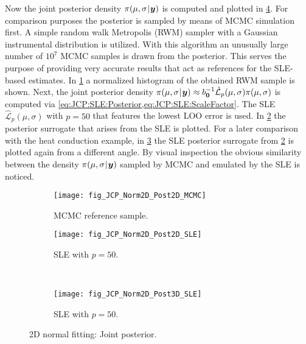 \par %
Now the joint posterior density \(\pi(\mu,\sigma {\:\!}|{\:\!} \bm{y})\) is computed and plotted in \cref{fig:JCP:Normal:Post2D}.
For comparison purposes the posterior is sampled by means of MCMC simulation first.
A simple random walk Metropolis (RWM) sampler with a Gaussian instrumental distribution is utilized.
With this algorithm an unusually large number of \(10^7\) MCMC samples is drawn from the posterior.
This serves the purpose of providing very accurate results that act as references for the SLE-based estimates.
In \cref{fig:JCP:Normal:Post2D:MCMC} a normalized histogram of the obtained RWM sample is shown.
Next, the joint posterior density \(\pi(\mu,\sigma {\:\!}|{\:\!} \bm{y}) \approx b_{\bm{0}}^{-1} \hat{\mathcal{L}}_p(\mu,\sigma) \pi(\mu,\sigma)\)
is computed via \cref{eq:JCP:SLE:Posterior,eq:JCP:SLE:ScaleFactor}.
The SLE \(\hat{\mathcal{L}}_p(\mu,\sigma)\) with \(p = 50\) that features the lowest LOO error is used.
In \cref{fig:JCP:Normal:Post2D:SLE} the posterior surrogate that arises from the SLE is plotted.
For a later comparison with the heat conduction example,
in \cref{fig:JCP:Normal:Post3D:SLE} the SLE posterior surrogate from \cref{fig:JCP:Normal:Post2D:SLE} is plotted again from a different angle.
By visual inspection the obvious similarity between the density \(\pi(\mu,\sigma {\:\!}|{\:\!} \bm{y})\) sampled by MCMC and emulated by the SLE is noticed.
\begin{figure}[htbp]
  \centering
  \begin{subfigure}[b]{\JCPsubWidth}
    \centering
    \texttt{[image: fig\_JCP\_Norm2D\_Post2D\_MCMC]}
    \caption{MCMC reference sample.}
    \label{fig:JCP:Normal:Post2D:MCMC}
  \end{subfigure}\hfill%
  \begin{subfigure}[b]{\JCPsubWidth}
    \centering
    \texttt{[image: fig\_JCP\_Norm2D\_Post2D\_SLE]}
    \caption{SLE with \(p = 50\).}
    \label{fig:JCP:Normal:Post2D:SLE}
  \end{subfigure}\\[1ex]%
  \begin{subfigure}[b]{\JCPsubWidth}
    \centering
    \texttt{[image: fig\_JCP\_Norm2D\_Post3D\_SLE]}
    \caption{SLE with \(p = 50\).}
    \label{fig:JCP:Normal:Post3D:SLE}
  \end{subfigure}%
  \caption[2D normal fitting: Joint posterior]{2D normal fitting: Joint posterior.}
  \label{fig:JCP:Normal:Post2D}
\end{figure}
